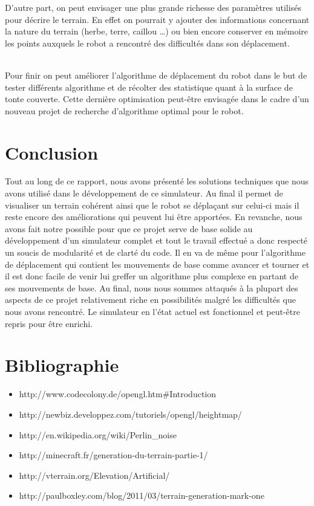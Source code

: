\documentclass[usenames,dvipsnames]{report}
\begin{document}
     
        D’autre part, on peut envisager une plus grande richesse des paramètres 
        utilisés pour décrire le terrain. En effet on pourrait y ajouter des informations
         concernant la nature du terrain (herbe, terre, caillou …)  ou bien encore 
         conserver en mémoire les points auxquels le robot a rencontré des difficultés
          dans son déplacement.
          
          \\
          
        Pour finir on peut améliorer l’algorithme de déplacement du robot dans le but de
         tester différents algorithme et de récolter des statistique quant à la surface de tonte couverte. Cette dernière optimisation peut-être envisagée dans le cadre d’un nouveau projet de recherche d’algorithme optimal pour le robot.

    \chapter{Conclusion}
    Tout au long de ce rapport, nous avons présenté les solutions techniques que nous avons utilisé dans le développement de ce simulateur. Au final il permet de visualiser un terrain cohérent ainsi que le robot se déplaçant sur celui-ci mais il reste encore des améliorations qui peuvent lui être apportées. En revanche, nous avons fait notre possible pour que ce projet serve de base solide au développement d’un simulateur complet et tout le travail effectué a donc respecté un soucis de modularité et de clarté du code. Il en va de même pour l’algorithme de déplacement qui contient les mouvements de base comme avancer et tourner  et il est donc facile de venir lui greffer un algorithme plus complexe en partant de ses mouvements de base.
        Au final, nous nous sommes attaqués à la plupart des aspects de ce projet relativement riche en possibilités malgré les difficultés que nous avons rencontré. Le simulateur en l’état actuel est fonctionnel et peut-être repris pour être enrichi. 
        
    \chapter{Bibliographie}

    \begin{itemize}
        \item http://www.codecolony.de/opengl.htm#Introduction
        \item http://newbiz.developpez.com/tutoriels/opengl/heightmap/
        \item http://en.wikipedia.org/wiki/Perlin\_noise
        \item http://minecraft.fr/generation-du-terrain-partie-1/
        \item http://vterrain.org/Elevation/Artificial/
        \item http://paulboxley.com/blog/2011/03/terrain-generation-mark-one
    \end{itemize}

    
\end{document}
